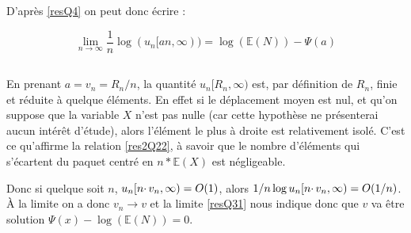 \documentclass[12pt]{article}
\newcommand{\esp}{\mathbb{E}}
\begin{document}
			D'après \ref{resQ4} on peut donc écrire :
			
			\begin{equation}
				\boxed{\lim\limits_{n\to\infty}\frac{1}{n}\log (u_n[an,\infty)) = \log(\esp(N))-\Psi(a) \label{resQ31}}
			\end{equation}
			
		\subsection{} %
			
			En prenant $a=v_n=R_n/n$, la quantité $u_n[R_n,\infty)$ est, par définition de $R_n$, finie et réduite à quelque éléments. En effet si le déplacement moyen est nul, et qu'on suppose que la variable $X$ n'est pas nulle (car cette hypothèse ne présenterai aucun intérêt d'étude), alors l'élément le plus à droite est relativement isolé. C'est ce qu'affirme la relation \ref{res2Q22}, à savoir que le nombre d'éléments qui s'écartent du paquet centré en $n*\esp(X)$ est négligeable.
			
			Donc si quelque soit $n$, $u_n[n\cdotp v_n,\infty)={\LARGE O}(1)$, alors $1/n \log u_n[n\cdotp v_n,\infty) = {\LARGE O}(1/n)$. À la limite on a donc $v_n\to v$ et la limite \ref{resQ31} nous indique donc que $v$ va être solution $\Psi(x)-\log(\esp(N))=0$.
			\setcounter{subsection}{3}
		\subsection{} %
			
			
			
\end{document}
